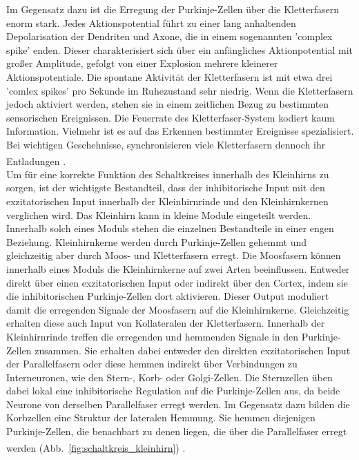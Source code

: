 Im Gegensatz dazu ist die Erregung der Purkinje-Zellen über die Kletterfasern enorm stark. Jedes Aktionspotential führt zu einer lang anhaltenden Depolarisation der Dendriten und Axone, die in einem sogenannten 'complex spike' enden. Dieser charakterisiert sich über ein anfängliches Aktionpotential mit großer Amplitude, gefolgt von einer Explosion mehrere kleinerer Aktionspotentiale. Die spontane Aktivität der Kletterfasern ist mit etwa drei 'comlex spikes' pro Sekunde im Ruhezustand sehr niedrig. Wenn die Kletterfasern jedoch aktiviert werden, stehen sie in einem zeitlichen Bezug zu bestimmten sensorischen Ereignissen. Die Feuerrate des Kletterfaser-System kodiert kaum Information. Vielmehr ist es auf das Erkennen bestimmter Ereignisse spezialisiert. Bei wichtigen Geschehnisse, synchronisieren viele Kletterfasern dennoch ihr Entladungen \textsuperscript{\cite[Kap.~42]{kandel2013principles}}.\\  
Um für eine korrekte Funktion des Schaltkreises innerhalb des Kleinhirns zu sorgen, ist der wichtigste Bestandteil, dass der inhibitorische Input mit den exzitatorischen Input innerhalb der Kleinhirnrinde und den Kleinhirnkernen verglichen wird. Das Kleinhirn kann in kleine Module eingeteilt werden. Innerhalb solch eines Moduls stehen die einzelnen Bestandteile in einer engen Beziehung. Kleinhirnkerne werden durch Purkinje-Zellen gehemmt und gleichzeitig aber durch Moos- und Kletterfasern erregt. Die Moosfasern können innerhalb eines Moduls die Kleinhirnkerne auf zwei Arten beeinflussen. Entweder direkt über einen exzitatorischen Input oder indirekt über den Cortex, indem sie die inhibitorischen Purkinje-Zellen dort aktivieren. Dieser Output moduliert damit die erregenden Signale der Moosfasern auf die Kleinhirnkerne. Gleichzeitig erhalten diese auch Input von Kollateralen der Kletterfasern. Innerhalb der Kleinhirnrinde treffen die erregenden und hemmenden Signale in den Purkinje-Zellen zusammen. Sie erhalten dabei entweder den direkten exzitatorischen Input der Parallelfasern oder diese hemmen indirekt über Verbindungen zu Interneuronen, wie den Stern-, Korb- oder Golgi-Zellen. Die Sternzellen üben dabei lokal eine inhibitorische Regulation auf die Purkinje-Zellen aus, da beide Neurone von derselben Parallelfaser erregt werden. Im Gegensatz dazu bilden die Korbzellen eine Struktur der lateralen Hemmung. Sie hemmen diejenigen Purkinje-Zellen, die benachbart zu denen liegen, die über die Parallelfaser erregt werden (Abb.~\ref{fig:schaltkreis_kleinhirn}) \textsuperscript{\cite[Kap.~42]{kandel2013principles}}.\\   
